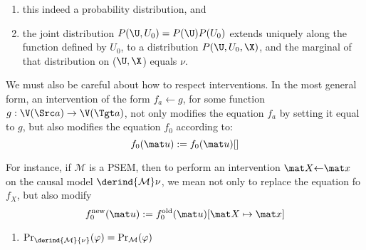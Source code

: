 \begin{subappendices}
{\begin{enumerate}
\item
 this indeed a probability distribution, and
 \item 
 the joint distribution $P(\U, U_0) = P(\U)P(U_0)$ 
 extends uniquely along the function defined by $U_0$, to a distribution $P(\U, U_0, \X)$, and the marginal of that distribution on ($\U, \X$) equals $\nu$.
\end{enumerate}
%

We must also be careful about how to respect interventions. In the most general form, an intervention of the form $f_a \gets g$, for some function $g : \V(\Src a) \to \V(\Tgt a)$, not only modifies the equation $f_a$ by setting it equal to $g$, but also modifies the equation $f_0$ according to:
\[
    f_0 ( \mat u ) := f_0(\mat u)[ ]
\]

\TODO

For instance, if $\mathcal M$ is a PSEM, then to perform an intervention $\mat X {\gets} \mat x$ on the causal model $\derind {\cal M}\nu$,
we mean not only to replace the equation fo $f_X$, but also modify 
\[
    f_0^{\text{new}}(\mat u) := 
    f_0^{\text{old}}(\mat u)[ \mat X \mapsto \mat x]
\]


\TODO

\begin{prop}
    \begin{enumerate}
    \item $\Pr_{\derind{\mathcal M}{\nu}}(\varphi)  = 
     \Pr_{\cal M}(\varphi)$
        
    \end{enumerate}
\end{prop}
%
}%

\end{subappendices}
